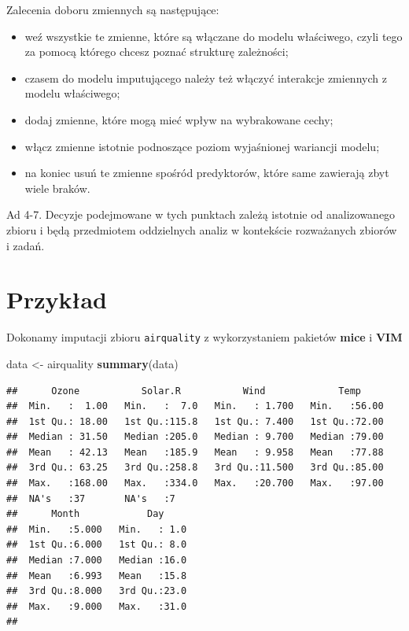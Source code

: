 \documentclass[]{book}
\newenvironment{Shaded}{\begin{snugshade}}{\end{snugshade}}
\newcommand{\KeywordTok}[1]{\textcolor[rgb]{0.13,0.29,0.53}{\textbf{#1}}}
\newcommand{\NormalTok}[1]{#1}
\newcommand{\StringTok}[1]{\textcolor[rgb]{0.31,0.60,0.02}{#1}}
\providecommand{\tightlist}{%
  \setlength{\itemsep}{0pt}\setlength{\parskip}{0pt}}
\theoremstyle{plain}
\theoremstyle{definition}
\begin{document}
Zalecenia doboru zmiennych są następujące:

\begin{itemize}
\tightlist
\item
  weź wszystkie te zmienne, które są włączane do modelu właściwego, czyli tego za pomocą którego chcesz poznać strukturę zależności;
\item
  czasem do modelu imputującego należy też włączyć interakcje zmiennych z modelu właściwego;
\item
  dodaj zmienne, które mogą mieć wpływ na wybrakowane cechy;
\item
  włącz zmienne istotnie podnoszące poziom wyjaśnionej wariancji modelu;
\item
  na koniec usuń te zmienne spośród predyktorów, które same zawierają zbyt wiele braków.
\end{itemize}

Ad 4-7. Decyzje podejmowane w tych punktach zależą istotnie od analizowanego zbioru i będą przedmiotem oddzielnych analiz w kontekście rozważanych zbiorów i zadań.

\hypertarget{przyk21}{%
\section{Przykład}\label{przyk21}}

Dokonamy imputacji zbioru \texttt{airquality} z wykorzystaniem pakietów \textbf{mice} i \textbf{VIM} \citep{R-VIM}

\begin{Shaded}
\begin{Highlighting}[]
\NormalTok{data <-}\StringTok{ }\NormalTok{airquality}
\KeywordTok{summary}\NormalTok{(data)}
\end{Highlighting}
\end{Shaded}

\begin{verbatim}
##      Ozone           Solar.R           Wind             Temp      
##  Min.   :  1.00   Min.   :  7.0   Min.   : 1.700   Min.   :56.00  
##  1st Qu.: 18.00   1st Qu.:115.8   1st Qu.: 7.400   1st Qu.:72.00  
##  Median : 31.50   Median :205.0   Median : 9.700   Median :79.00  
##  Mean   : 42.13   Mean   :185.9   Mean   : 9.958   Mean   :77.88  
##  3rd Qu.: 63.25   3rd Qu.:258.8   3rd Qu.:11.500   3rd Qu.:85.00  
##  Max.   :168.00   Max.   :334.0   Max.   :20.700   Max.   :97.00  
##  NA's   :37       NA's   :7                                       
##      Month            Day      
##  Min.   :5.000   Min.   : 1.0  
##  1st Qu.:6.000   1st Qu.: 8.0  
##  Median :7.000   Median :16.0  
##  Mean   :6.993   Mean   :15.8  
##  3rd Qu.:8.000   3rd Qu.:23.0  
##  Max.   :9.000   Max.   :31.0  
## 
\end{verbatim}
\end{document}
